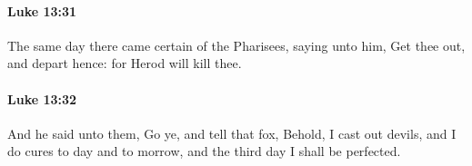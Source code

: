 		\paragraph{Luke 13:31} %
			\label{LUKE-13-31}

			The same day there came certain of the Pharisees, saying unto him, Get thee out, and depart hence: for Herod will kill thee.

			\begin{framed}
			\scriptsize
				\begin{compactdesc}
					\item[SBLG] 
				\end{compactdesc}
			\end{framed}

		\paragraph{Luke 13:32} %
			\label{LUKE-13-32}

			And he said unto them, Go ye, and tell that fox, Behold, I cast out devils, and I do cures to day and to morrow, and the third day I shall be perfected.

